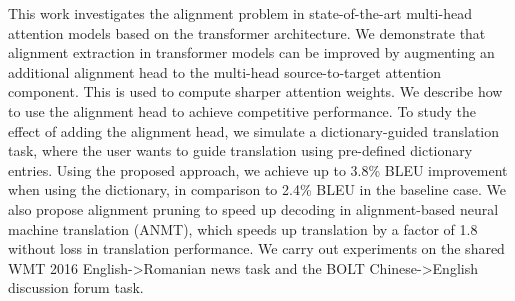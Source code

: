 This work investigates the alignment problem in state-of-the-art multi-head attention models based on the transformer architecture. We demonstrate that alignment extraction in transformer models can be improved by augmenting an additional alignment head to the multi-head source-to-target attention component. This is used to compute sharper  attention weights. We describe how to use the alignment head to achieve competitive performance. To study the effect of adding the alignment head, we simulate a dictionary-guided translation task, where  the user wants to guide translation using pre-defined dictionary entries. Using the proposed approach, we achieve up to 3.8\% BLEU improvement when using the dictionary, in comparison to 2.4\% BLEU in the baseline case. We also propose alignment pruning to speed up decoding in alignment-based neural machine translation (ANMT), which speeds up translation by a factor of 1.8 without loss in translation performance. We carry out experiments on the shared WMT 2016 English->Romanian news task and the BOLT Chinese->English discussion forum task.
